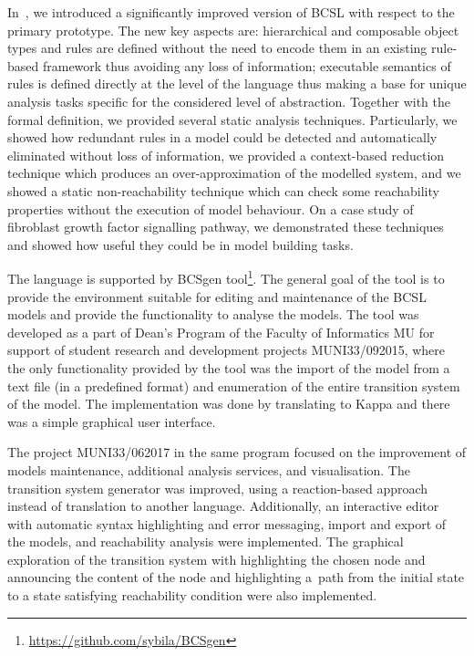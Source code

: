 \documentclass[11pt,a4paper]{report}
\begin{document}
In~\cite{trojak2018sasb}, we introduced a significantly improved version of BCSL with respect to the primary prototype. The new key aspects are: hierarchical and composable object types and rules are defined without the need to encode them in an existing rule-based framework thus avoiding any loss of information; executable semantics of rules is defined directly at the level of the language thus making a base for unique analysis tasks specific for the considered level of abstraction. Together with the formal definition, we provided several static analysis techniques. Particularly, we showed how redundant rules in a model could be detected and automatically eliminated without loss of information, we provided a context-based reduction technique which produces an over-approximation of the modelled system, and we showed a static non-reachability technique which can check some reachability properties without the execution of model behaviour. On a case study of fibroblast growth factor signalling pathway, we demonstrated these techniques and showed how useful they could be in model building tasks.

The language is supported by BCSgen tool\footnote{\href{https://github.com/sybila/BCSgen}{https://github.com/sybila/BCSgen}}. The general goal of the tool is to provide the environment suitable for editing and maintenance of the BCSL models and provide the functionality to analyse the models. The tool was developed as a part of Dean's Program of the Faculty of Informatics MU for support of student research and development projects MUNI33/092015, where the only functionality provided by the tool was the import of the model from a text file (in a predefined format) and enumeration of the entire transition system of the model. The implementation was done by translating to Kappa and there was a simple graphical user interface.

The project MUNI33/062017 in the same program focused on the improvement of models maintenance, additional analysis services, and visualisation. The transition system generator was improved, using a reaction-based approach instead of translation to another language. Additionally, an interactive editor with automatic syntax highlighting and error messaging, import and export of the models, and reachability analysis were implemented. The graphical exploration of the transition system with highlighting the chosen node and announcing the content of the node and highlighting a~path from the initial state to a state satisfying reachability condition were also implemented.
\end{document}
